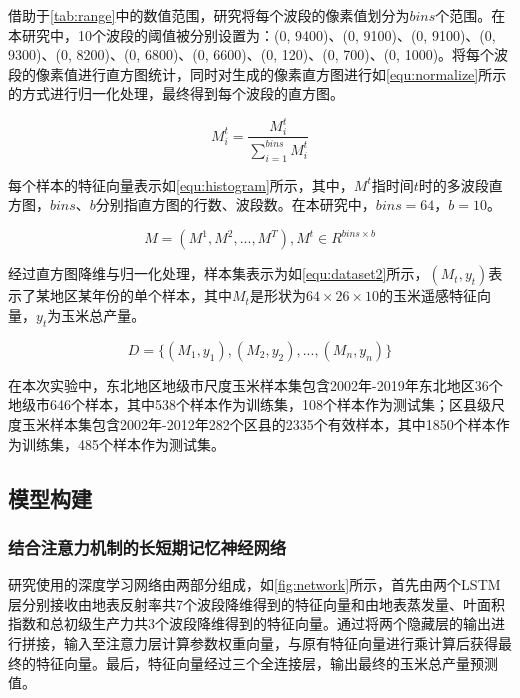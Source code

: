 \par 借助于\autoref{tab:range}中的数值范围，研究将每个波段的像素值划分为$bins$个范围。在本研究中，10个波段的阈值被分别设置为：(0, 9400)、(0, 9100)、(0, 9100)、(0, 9300)、(0, 8200)、(0, 6800)、(0, 6600)、(0, 120)、(0, 700)、(0, 1000)。将每个波段的像素值进行直方图统计，同时对生成的像素直方图进行如\autoref{equ:normalize}所示的方式进行归一化处理，最终得到每个波段的直方图。

\begin{equation}
  \label{equ:normalize}
  M^t_{i}=\frac{M^t_{i}}{\sum_{i=1}^{bins}M^t_{i}}
\end{equation}

\par 每个样本的特征向量表示如\autoref{equ:histogram}所示，其中，$M^t$指时间$t$时的多波段直方图，$bins$、$b$分别指直方图的行数、波段数。在本研究中，$bins=64$，$b=10$。

\begin{equation}
  \label{equ:histogram}
  M=(M^1, M^2, ..., M^T), M^t\in R^{bins\times b}
\end{equation}

\par 经过直方图降维与归一化处理，样本集表示为如\autoref{equ:dataset2}所示，$(M_t, y_t)$表示了某地区某年份的单个样本，其中$M_t$是形状为$64\times 26\times 10$的玉米遥感特征向量，$y_t$为玉米总产量。

\begin{equation}
  \label{equ:dataset2}
  D=\{(M_1, y_1),(M_2, y_2), ..., (M_n, y_n)\}
\end{equation}

\par 在本次实验中，东北地区地级市尺度玉米样本集包含2002年-2019年东北地区36个地级市646个样本，其中538个样本作为训练集，108个样本作为测试集；区县级尺度玉米样本集包含2002年-2012年282个区县的2335个有效样本，其中1850个样本作为训练集，485个样本作为测试集。

\subsection{模型构建}
\subsubsection{结合注意力机制的长短期记忆神经网络}

\par 研究使用的深度学习网络由两部分组成，如\autoref{fig:network}所示，首先由两个LSTM层分别接收由地表反射率共7个波段降维得到的特征向量和由地表蒸发量、叶面积指数和总初级生产力共3个波段降维得到的特征向量。通过将两个隐藏层的输出进行拼接，输入至注意力层计算参数权重向量，与原有特征向量进行乘计算后获得最终的特征向量。最后，特征向量经过三个全连接层，输出最终的玉米总产量预测值。

